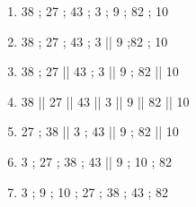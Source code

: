 \documentclass[paper=a4, fontsize=9pt]{scrartcl} %
\begin{document}
\begin{multicols}{2}
\begin{enumerate}
\item 38 ; 27 ; 43 ; 3 ; 9 ; 82 ; 10
\item 38 ; 27 ; 43 ; 3 || 9 ;82 ; 10
\item 38 ; 27 || 43 ; 3 || 9 ; 82 || 10
\item 38 || 27 || 43 || 3 || 9 || 82 || 10
\item 27 ; 38 || 3 ; 43 || 9 ; 82 || 10
\item 3 ; 27 ; 38 ; 43 || 9 ; 10 ; 82
\item 3 ; 9 ; 10 ; 27 ; 38 ; 43 ; 82
\end{enumerate}
\end{multicols}
\end{document}
